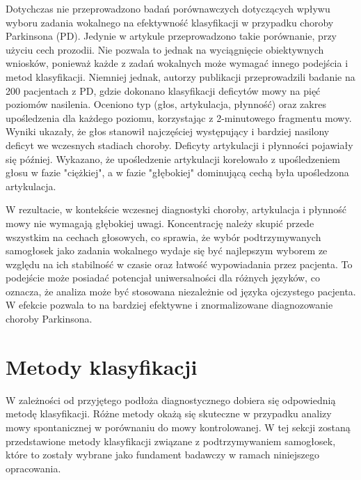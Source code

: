 Dotychczas nie przeprowadzono badań porównawczych dotyczących wpływu wyboru zadania wokalnego na efektywność klasyfikacji w przypadku choroby Parkinsona (PD).
Jedynie w artykule  \cite{vocal_task_comparision} przeprowadzono takie porównanie, przy użyciu cech prozodii.
Nie pozwala to jednak na wyciągnięcie obiektywnych wniosków, ponieważ każde z zadań wokalnych może wymagać innego podejścia i metod klasyfikacji.
Niemniej jednak, autorzy publikacji \cite{monitoring_speech} przeprowadzili badanie na 200 pacjentach z PD,
gdzie dokonano klasyfikacji deficytów mowy na pięć poziomów nasilenia.
Oceniono typ (głos, artykulacja, płynność) oraz zakres upośledzenia dla każdego poziomu, korzystając z 2-minutowego fragmentu mowy.
Wyniki ukazały, że głos stanowił najczęściej występujący i bardziej nasilony deficyt we wczesnych stadiach choroby.
Deficyty artykulacji i płynności pojawiały się później.
Wykazano, że upośledzenie artykulacji korelowało z upośledzeniem głosu w fazie "ciężkiej", a w fazie "głębokiej" dominującą cechą była upośledzona artykulacja.

W rezultacie, w kontekście wczesnej diagnostyki choroby, artykulacja i płynność mowy nie wymagają głębokiej uwagi.
Koncentrację należy skupić przede wszystkim na cechach głosowych, co sprawia, że wybór podtrzymywanych samogłosek jako zadania wokalnego
wydaje się być najlepszym wyborem ze względu na ich stabilność w czasie oraz łatwość wypowiadania przez pacjenta.
To podejście może posiadać potencjał uniwersalności dla różnych języków, co oznacza, że analiza może być stosowana
niezależnie od języka ojczystego pacjenta.
W efekcie pozwala to na bardziej efektywne i znormalizowane diagnozowanie choroby Parkinsona.


\section{Metody klasyfikacji}\label{sec:metody-klasyfikacji}

W zależności od przyjętego podłoża diagnostycznego dobiera się odpowiednią metodę klasyfikacji.
Różne metody okażą się skuteczne w przypadku analizy mowy spontanicznej w porównaniu do mowy kontrolowanej.
W tej sekcji zostaną przedstawione metody klasyfikacji związane z podtrzymywaniem samogłosek, które to zostały wybrane jako
fundament badawczy w ramach niniejszego opracowania.



